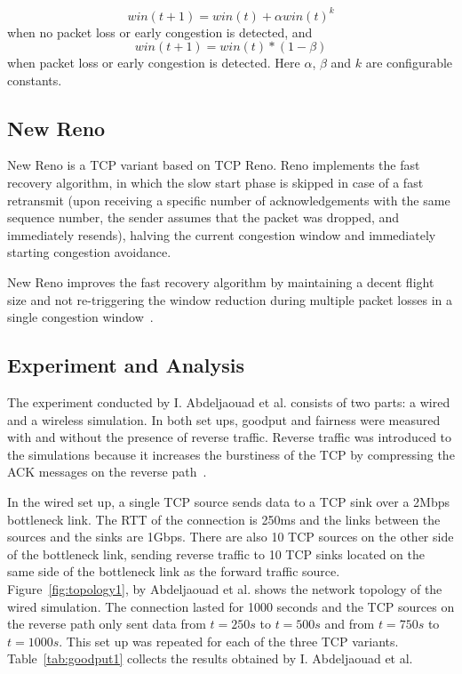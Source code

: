 \[
win(t + 1) = win(t) + \alpha win(t)^k
\]
when no packet loss or early congestion is detected, and
\[
win(t + 1) = win(t) * (1 - \beta)
\]
when packet loss or early congestion is detected. Here $\alpha$, $\beta$ and $k$ are configurable constants. 
  
\subsection{New Reno}

New Reno is a TCP variant based on TCP Reno. Reno implements the fast recovery algorithm, in which the slow start phase is skipped in case of a fast retransmit (upon receiving a specific number of acknowledgements with the same sequence number, the sender assumes that the packet was dropped, and immediately resends), halving the current congestion window and immediately starting congestion avoidance. 

New Reno improves the fast recovery algorithm by maintaining a decent flight size and not re-triggering the window reduction during multiple packet losses in a single congestion window~\cite{rfc6582}.  

\subsection{Experiment and Analysis}

The experiment conducted by I. Abdeljaouad et al. consists of two parts: a wired and a wireless simulation. In both set ups, goodput and fairness were measured with and without the presence of reverse traffic. Reverse traffic was introduced to the simulations because it increases the burstiness of the TCP by compressing the ACK messages on the reverse path~\cite{Abdeljaouad10}. 

In the wired set up, a single TCP source sends data to a TCP sink over a 2Mbps bottleneck link. The RTT of the connection is 250ms and the links between the sources and the sinks are 1Gbps. There are also 10 TCP sources on the other side of the bottleneck link, sending reverse traffic to 10 TCP sinks located on the same side of the bottleneck link as the forward traffic source. Figure~\ref{fig:topology1}, by Abdeljaouad et al. shows the network topology of the wired simulation. The connection lasted for 1000 seconds and the TCP sources on the reverse path only sent data from $t=250s$ to $t=500s$ and from $t=750s$ to $t=1000s$. This set up was repeated for each of the three TCP variants. Table~\ref{tab:goodput1} collects the results obtained by  I. Abdeljaouad et al.

